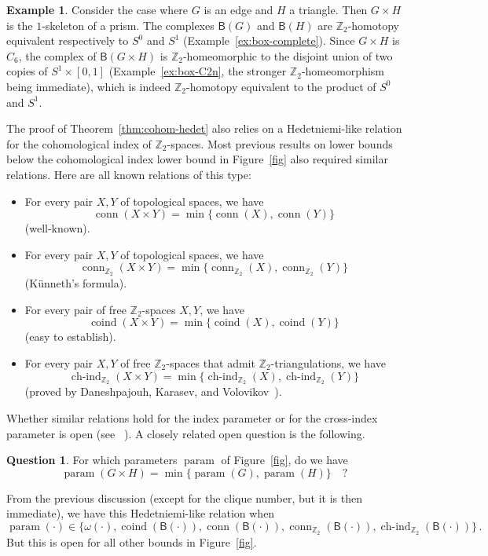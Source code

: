 \documentclass[12pt]{amsart}
\theoremstyle{definition}
\newtheorem{example}{Example}
\newtheorem{question}{Question}
\def\Z{\mathbb{Z}}
\def\B{\mathsf{B}}
\def\conn{\operatorname{conn}}
\def\coind{\operatorname{coind}}
\def\hind{\operatorname{ch-ind}_{\Z_2}}
\def\param{\operatorname{param}}
\begin{document}
\begin{example}
    Consider the case where $G$ is an edge and $H$ a triangle. Then $G \times H$ is the $1$-skeleton of a prism. The complexes $\B(G)$ and $\B(H)$ are $\Z_2$-homotopy equivalent respectively to $S^0$ and $S^1$ (Example~\ref{ex:box-complete}). Since $G \times H$ is $C_6$, the complex of $\B(G\times H)$ is $\Z_2$-homeomorphic to the disjoint union of two copies of $S^1 \times [0,1]$ (Example~\ref{ex:box-C2n}, the stronger $\Z_2$-homeomorphism being immediate), which is indeed $\Z_2$-homotopy equivalent to the product of $S^0$ and $S^1$.
\end{example}

The proof of Theorem~\ref{thm:cohom-hedet} also relies on a Hedetniemi-like relation for the cohomological index of $\Z_2$-spaces. Most previous results on lower bounds below the cohomological index lower bound in Figure~\ref{fig} also required similar relations. Here are all known relations of this type:
\begin{itemize}
    \item For every pair $X,Y$ of topological spaces, we have 
    \[
    \conn(X \times Y) = \min\{\conn(X),\conn(Y)\}
    \]
    (well-known).
    \item For every pair $X,Y$ of topological spaces, we have 
    \[
    \conn_{\Z_2}(X \times Y) = \min\{\conn_{\Z_2}(X),\conn_{\Z_2}(Y)\}
    \]
    (K\"unneth's formula).
    \item For every pair of free $\Z_2$-spaces $X,Y$, we have 
    \[
    \coind(X \times Y) = \min\{\coind(X),\coind(Y)\}
    \]
    (easy to establish).
    \item For every pair $X,Y$ of free $\Z_2$-spaces that admit $\Z_2$-triangulations, we have 
    \[
    \hind(X \times Y) = \min\{\hind(X),\hind(Y)\}
    \]
    (proved by Daneshpajouh, Karasev, and Volovikov~\cite{daneshpajouh2023hedetniemi}).
\end{itemize}
Whether similar relations hold for the index parameter or for the cross-index parameter is open (see ~\cite{bui2023topological, matsushita2019index,wrochna2019inverse}).\label{page:hedet-param-top} A closely related open question is the following.

\begin{question}\label{q:hedet}
For which parameters $\param$ of Figure~\ref{fig}, do we have
\[
\param(G\times H) = \min\{\param(G),\param(H)\}\quad ?
\]
\end{question}
From the previous discussion (except for the clique number, but it is then immediate), we have this Hedetniemi-like relation when 
\[
\param(\cdot)\in\{\omega(\cdot),\coind(\B(\cdot)),\conn(\B(\cdot)),\conn_{\Z_2}(\B(\cdot)),\hind(\B(\cdot))\}\, .
\]
But this is open for all other bounds in Figure~\ref{fig}.\label{page:hedet-paramG}
\end{document}
